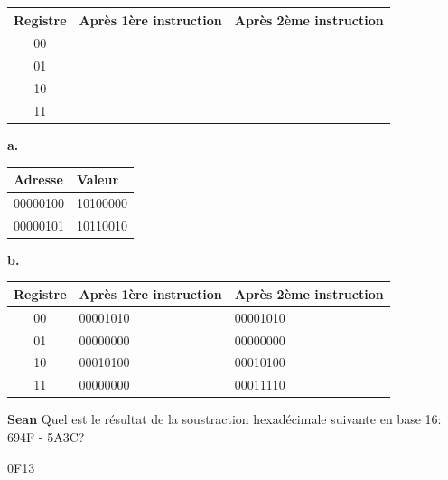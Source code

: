 \begin{Exercice}[10 minutes]
\begin{center}
\begin{tabular}{|c|l|l|}
\hline
\textbf{Registre} & \textbf{Après 1ère instruction} & \textbf{Après 2ème instruction} \\
\hline
00 & & \\ \hline
01 & & \\ \hline
10 & & \\ \hline
11 & & \\ 
\hline
\end{tabular}
\end{center}

\begin{solution}
\textbf{a.}
\begin{center}
\begin{tabular}{|l|l|}
\hline
\textbf{Adresse} & \textbf{Valeur} \\
\hline
00000100 & 10100000\\ \hline
00000101 & 10110010\\ 
\hline
\end{tabular}
\end{center}

\bigskip

\textbf{b.}

\begin{center}
\begin{tabular}{|c|l|l|}
\hline
\textbf{Registre} & \textbf{Après 1ère instruction} & \textbf{Après 2ème instruction} \\
\hline
00 & 00001010 & 00001010 \\ \hline
01 & 00000000 & 00000000 \\ \hline
10 & 00010100 & 00010100 \\ \hline
11 & 00000000 & 00011110 \\ 
\hline
\end{tabular}
\end{center}

\end{solution}
\end{Exercice}

\begin{Exercice}[15 minutes]\textbf{Sean}
Quel est le résultat de la soustraction hexadécimale suivante en base 16: 694F - 5A3C?

\begin{solution}
0F13
\end{solution}
\end{Exercice}


